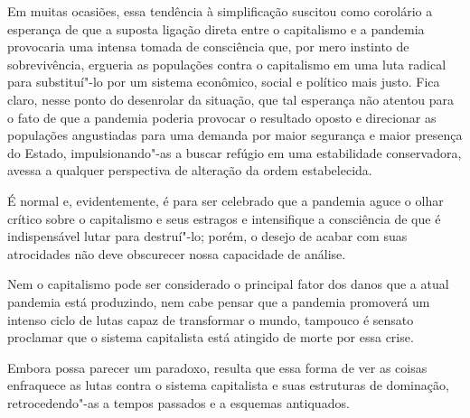 Em muitas ocasiões, essa tendência à simplificação suscitou como
corolário a esperança de que a suposta ligação direta entre o
capitalismo e a pandemia provocaria uma intensa tomada de consciência
que, por mero instinto de sobrevivência, ergueria as populações contra o
capitalismo em uma luta radical para substituí"-lo por um sistema
econômico, social e político mais justo. Fica claro, nesse ponto do
desenrolar da situação, que tal esperança não atentou para o fato de que
a pandemia poderia provocar o resultado oposto e direcionar as
populações angustiadas para uma demanda por maior segurança e maior
presença do Estado, impulsionando"-as a buscar refúgio em uma
estabilidade conservadora, avessa a qualquer perspectiva de alteração da
ordem estabelecida.

É normal e, evidentemente, é para ser celebrado que a pandemia aguce o
olhar crítico sobre o capitalismo e seus estragos e intensifique a
consciência de que é indispensável lutar para destruí"-lo; porém, o
desejo de acabar com suas atrocidades não deve obscurecer nossa
capacidade de análise.

Nem o capitalismo pode ser considerado o principal fator dos danos que a
atual pandemia está produzindo, nem cabe pensar que a pandemia promoverá
um intenso ciclo de lutas capaz de transformar o mundo, tampouco é
sensato proclamar que o sistema capitalista está atingido de morte por
essa crise.

Embora possa parecer um paradoxo, resulta que essa forma de ver as
coisas enfraquece as lutas contra o sistema capitalista e suas
estruturas de dominação, retrocedendo"-as a tempos passados e a esquemas
antiquados.



